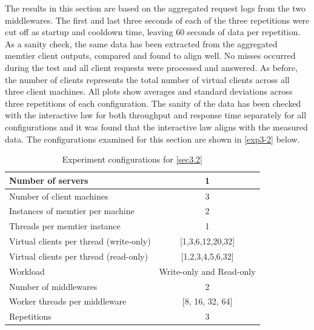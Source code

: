 \documentclass[11pt,a4paper]{article}
\begin{document}
The results in this section are based on the aggregated request logs from the two middlewares. The first and last three seconds of each of the three repetitions were cut off as startup and cooldown time, leaving 60 seconds of data per repetition. As a sanity check, the same data has been extracted from the aggregated memtier client outputs, compared and found to align well. No misses occurred during the test and all client requests were processed and answered. As before, the number of clients represents the total number of virtual clients across all three client machines. All plots show averages and standard deviations across three repetitions of each configuration. The sanity of the data has been checked with the interactive law for both throughput and response time separately for all configurations and it was found that the interactive law aligns with the measured data. The configurations examined for this section are shown in \autoref{exp3-2} below.

\begin{table}
    \centering
	\begin{tabular}{|l|c|}
		\hline Number of servers                & 1                        \\ 
		\hline Number of client machines        & 3                        \\ 
		\hline Instances of memtier per machine & 2                        \\ 
		\hline Threads per memtier instance     & 1                        \\
		\hline Virtual clients per thread (write-only)  & [1,3,6,12,20,32] \\ 
		\hline Virtual clients per thread (read-only)   & [1,2,3,4,5,6,32] \\ 
		\hline Workload                         & Write-only and Read-only \\
		\hline Number of middlewares            & 2                        \\
		\hline Worker threads per middleware    & [8, 16, 32, 64]          \\
		\hline Repetitions                      & 3                        \\ 
		\hline 
	\end{tabular}
	\caption{Experiment configurations for \autoref{sec3.2}} \label{exp3-2}
\end{table}
\end{document}
